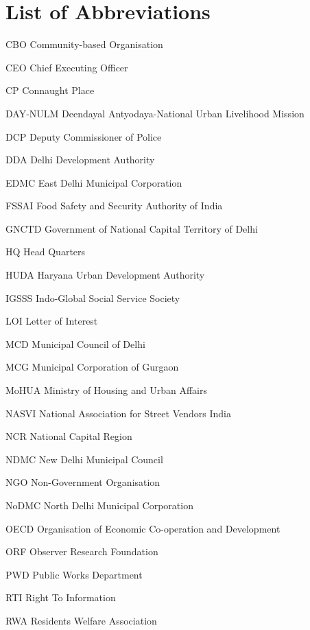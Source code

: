 \documentclass[a4paper, 12pt, twoside]{article}
\begin{document}
\section*{List of Abbreviations}
\begin{abbrv}
      	\item[CBO]			Community-based Organisation
	\item[CEO]			Chief Executing Officer
        	\item[CP]				Connaught Place
        	\item[DAY-NULM]		Deendayal Antyodaya-National Urban Livelihood Mission
        	\item[DCP]			Deputy Commissioner of Police
        	\item[DDA]			Delhi Development Authority
        	\item[EDMC]			East Delhi Municipal Corporation
        	\item[FSSAI]			Food Safety and Security Authority of India
	\item[GNCTD]			Government of National Capital Territory of Delhi
	\item[HQ]				Head Quarters
	\item[HUDA]			Haryana Urban Development Authority
	\item[IGSSS]			Indo-Global Social Service Society
	\item[LOI]				Letter of Interest
	\item[MCD]			Municipal Council of Delhi
	\item[MCG]			Municipal Corporation of Gurgaon
	\item[MoHUA]			Ministry of Housing and Urban Affairs
	\item[NASVI]			National Association for Street Vendors India
	\item[NCR]			National Capital Region
	\item[NDMC]			New Delhi Municipal Council
	\item[NGO]			Non-Government Organisation
	\item[NoDMC]			North Delhi Municipal Corporation
	\item[OECD]			Organisation of Economic Co-operation and Development
	\item[ORF]			Observer Research Foundation
	\item[PWD]			Public Works Department
	\item[RTI]				Right To Information
	\item[RWA]			Residents Welfare Association

\end{abbrv}
\end{document}
